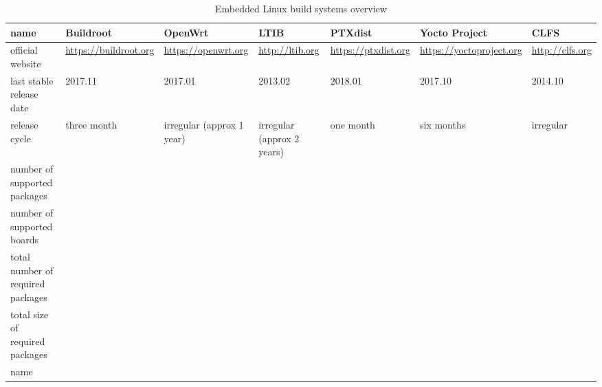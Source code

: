 \documentclass[printmode]{mgr}
\begin{document}
\begin{landscape}

\begin{table}
  \begin{tabular}{| p{3cm} | p{3cm} | p{3cm} | p{3cm} | p{3cm} | p{3cm} | p{3cm} |}
    \hline
    name & Buildroot & OpenWrt & LTIB & PTXdist & Yocto Project & CLFS \\
    \hline
    official website & \url{https://buildroot.org} & \url{https://openwrt.org} & \url{http://ltib.org} & \url{https://ptxdist.org} & \url{https://yoctoproject.org} & \url{http://clfs.org}\\
    \hline
    last stable release date & 2017.11 & 2017.01 & 2013.02 & 2018.01 & 2017.10 & 2014.10\\
    \hline
    release cycle & three month\cite{web:buildroot-releases} & irregular (approx 1 year) & irregular (approx 2 years)\cite{web:ltib-releases} & one month\cite{web:ptxdist-releases} & six months\cite{web:yoctoproject-releases} & irregular\cite{web:clfs-releases}\\
    \hline
    number of supported packages &  &  &  &  &  & \\
    \hline
    number of supported boards &  &  &  &  &  & \\
    \hline
    total number of required packages &  &  &  &  &  & \\
    \hline
    total size of required packages &  &  &  &  &  & \\
    \hline
    name &  &  &  &  &  & \\
    \hline
  \end{tabular}
  \caption{Embedded Linux build systems overview}
\end{table}




















\end{landscape}
\end{document}
